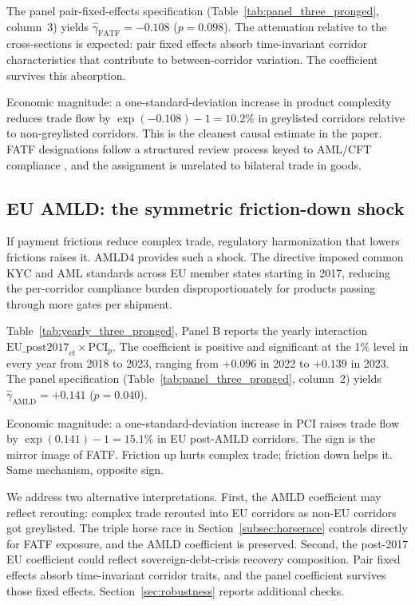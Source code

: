 The panel pair-fixed-effects specification (Table~\ref{tab:panel_three_pronged}, column~3) yields $\hat{\gamma}_{\text{FATF}} = -0.108$ ($p = 0.098$). The attenuation relative to the cross-sections is expected: pair fixed effects absorb time-invariant corridor characteristics that contribute to between-corridor variation. The coefficient survives this absorption.

Economic magnitude: a one-standard-deviation increase in product complexity reduces trade flow by $\exp(-0.108) - 1 = 10.2\%$ in greylisted corridors relative to non-greylisted corridors. This is the cleanest causal estimate in the paper. FATF designations follow a structured review process keyed to AML/CFT compliance \citep{Borchert2024_broken_relationships}, and the assignment is unrelated to bilateral trade in goods.

\subsection{EU AMLD: the symmetric friction-down shock}
\label{subsec:amld}

If payment frictions reduce complex trade, regulatory harmonization that lowers frictions raises it. AMLD4 provides such a shock. The directive imposed common KYC and AML standards across EU member states starting in 2017, reducing the per-corridor compliance burden disproportionately for products passing through more gates per shipment.

Table~\ref{tab:yearly_three_pronged}, Panel B reports the yearly interaction $\text{EU\_post2017}_{ct} \times \text{PCI}_p$. The coefficient is positive and significant at the 1\% level in every year from 2018 to 2023, ranging from $+0.096$ in 2022 to $+0.139$ in 2023. The panel specification (Table~\ref{tab:panel_three_pronged}, column~2) yields $\hat{\gamma}_{\text{AMLD}} = +0.141$ ($p = 0.040$).

Economic magnitude: a one-standard-deviation increase in PCI raises trade flow by $\exp(0.141) - 1 = 15.1\%$ in EU post-AMLD corridors. The sign is the mirror image of FATF. Friction up hurts complex trade; friction down helps it. Same mechanism, opposite sign.

We address two alternative interpretations. First, the AMLD coefficient may reflect rerouting: complex trade rerouted into EU corridors as non-EU corridors got greylisted. The triple horse race in Section~\ref{subsec:horserace} controls directly for FATF exposure, and the AMLD coefficient is preserved. Second, the post-2017 EU coefficient could reflect sovereign-debt-crisis recovery composition. Pair fixed effects absorb time-invariant corridor traits, and the panel coefficient survives those fixed effects. Section~\ref{sec:robustness} reports additional checks.

